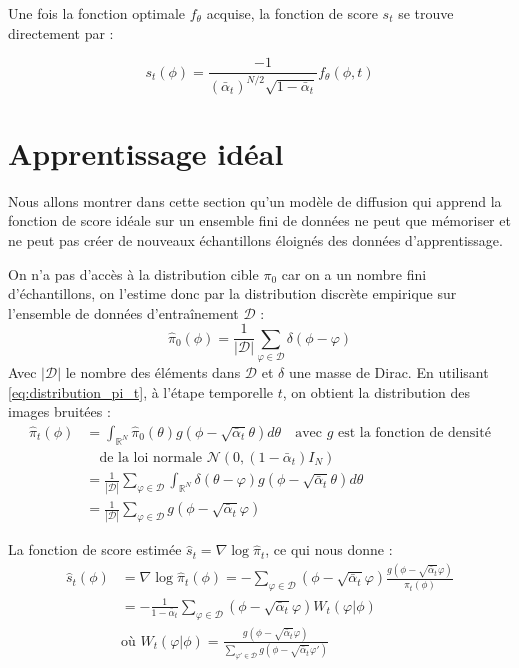 \documentclass[a4paper,10pt]{article}
\theoremstyle{definition} %
\theoremstyle{definition} %
\theoremstyle{definition} %
\theoremstyle{definition} %
\begin{document}
Une fois la fonction optimale $f_\theta$ acquise, la fonction de score $s_t$ se trouve directement par :

\[
s_t(\phi) = \frac{-1}{(\bar \alpha_t)^{N/2} \sqrt{1-\bar{\alpha}_t}} f_\theta(\phi,t)
\]


\section{Apprentissage idéal}
Nous allons montrer dans cette section qu'un modèle de diffusion qui apprend la fonction de score idéale sur un ensemble fini de données ne peut que mémoriser et ne peut pas créer de nouveaux échantillons éloignés des données d'apprentissage.

On n'a pas d'accès à la distribution cible $\pi_0$ car on a un nombre fini d'échantillons, on l'estime donc par la distribution discrète empirique sur l'ensemble de données d'entraînement $\mathcal{D}$ :
\begin{equation*}
    \hat{\pi}_0(\phi) = \frac{1}{|\mathcal{D}|} \sum_{\varphi \in \mathcal{D}} \delta(\phi - \varphi)
\end{equation*}
Avec $|\mathcal{D}|$ le nombre des éléments dans $\mathcal{D}$ et $\delta$ une masse de Dirac.
En utilisant \cref{eq:distribution_pi_t}, à l'étape temporelle $t$, on obtient la distribution des images bruitées :
\begin{align*}
\hat{\pi}_t(\phi) &= \int_{\mathbb{R}^N} \hat{\pi}_0(\theta) g(\phi - \sqrt{\bar \alpha_t}\theta) d\theta \quad \text{avec } g \text{ est la fonction de densité} \\
&\quad \text{de la loi normale } \mathcal{N}(0, (1-\bar \alpha_t)I_N) \\
&= \frac{1}{|\mathcal{D}|} \sum_{\varphi \in \mathcal{D}} \int_{\mathbb{R}^N} \delta(\theta - \varphi) g(\phi - \sqrt{\bar \alpha_t}\theta) d\theta \\
&= \frac{1}{|\mathcal{D}|} \sum_{\varphi \in \mathcal{D}} g(\phi - \sqrt{\bar \alpha_t}\varphi)
\end{align*}

La fonction de score estimée $\hat{s}_t = \nabla \log \hat{\pi}_t$, ce qui nous donne :
\begin{align*}
\hat{s}_t(\phi) &= \nabla \log \hat{\pi}_t(\phi) = -\sum_{\varphi \in \mathcal{D}} (\phi - \sqrt{\bar \alpha_t}\varphi) \frac{g(\phi - \sqrt{\bar \alpha_t}\varphi)}{\hat{\pi}_t(\phi)} \\
&= -\frac{1}{1-\bar \alpha_t} \sum_{\varphi \in \mathcal{D}} (\phi - \sqrt{\bar \alpha_t}\varphi) W_t(\varphi | \phi) \\
& \text{où }W_t(\varphi | \phi) = \frac{g(\phi - \sqrt{ \bar \alpha_t}\varphi)}{\sum_{\varphi' \in \mathcal{D}} g(\phi - \sqrt{\bar \alpha_t}\varphi')}
\end{align*}
\end{document}
